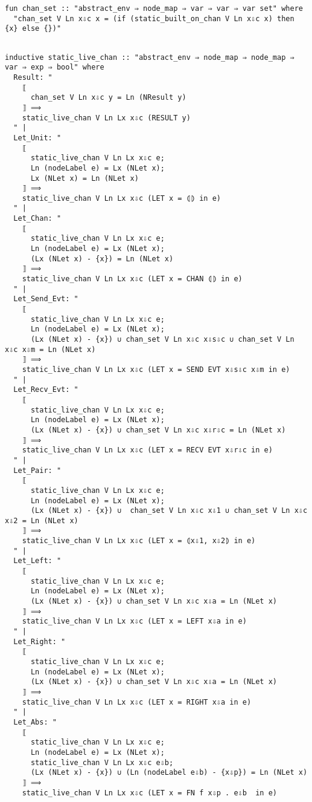 \documentclass{article}
\begin{document}
\begin{lstlisting}[style=codestyle1, escapechar=\%]
  fun chan_set :: "abstract_env ⇒ node_map ⇒ var ⇒ var ⇒ var set" where
  "chan_set V Ln x⇩c x = (if (static_built_on_chan V Ln x⇩c x) then {x} else {})"
  \end{lstlisting}


\begin{lstlisting}[style=codestyle1, escapechar=\%]

inductive static_live_chan :: "abstract_env ⇒ node_map ⇒ node_map ⇒ var ⇒ exp ⇒ bool" where
  Result: "
    ⟦
      chan_set V Ln x⇩c y = Ln (NResult y)
    ⟧ ⟹
    static_live_chan V Ln Lx x⇩c (RESULT y)
  " |
  Let_Unit: "
    ⟦
      static_live_chan V Ln Lx x⇩c e;
      Ln (nodeLabel e) = Lx (NLet x);
      Lx (NLet x) = Ln (NLet x)
    ⟧ ⟹
    static_live_chan V Ln Lx x⇩c (LET x = ⦇⦈ in e)
  " |
  Let_Chan: "
    ⟦
      static_live_chan V Ln Lx x⇩c e;
      Ln (nodeLabel e) = Lx (NLet x);
      (Lx (NLet x) - {x}) = Ln (NLet x)
    ⟧ ⟹
    static_live_chan V Ln Lx x⇩c (LET x = CHAN ⦇⦈ in e)
  " |
  Let_Send_Evt: "
    ⟦
      static_live_chan V Ln Lx x⇩c e;
      Ln (nodeLabel e) = Lx (NLet x);
      (Lx (NLet x) - {x}) ∪ chan_set V Ln x⇩c x⇩s⇩c ∪ chan_set V Ln x⇩c x⇩m = Ln (NLet x)
    ⟧ ⟹
    static_live_chan V Ln Lx x⇩c (LET x = SEND EVT x⇩s⇩c x⇩m in e)
  " |
  Let_Recv_Evt: "
    ⟦
      static_live_chan V Ln Lx x⇩c e;
      Ln (nodeLabel e) = Lx (NLet x);
      (Lx (NLet x) - {x}) ∪ chan_set V Ln x⇩c x⇩r⇩c = Ln (NLet x)
    ⟧ ⟹
    static_live_chan V Ln Lx x⇩c (LET x = RECV EVT x⇩r⇩c in e)
  " |
  Let_Pair: "
    ⟦
      static_live_chan V Ln Lx x⇩c e;
      Ln (nodeLabel e) = Lx (NLet x);
      (Lx (NLet x) - {x}) ∪  chan_set V Ln x⇩c x⇩1 ∪ chan_set V Ln x⇩c x⇩2 = Ln (NLet x)
    ⟧ ⟹
    static_live_chan V Ln Lx x⇩c (LET x = ⦇x⇩1, x⇩2⦈ in e)
  " |
  Let_Left: "
    ⟦
      static_live_chan V Ln Lx x⇩c e;
      Ln (nodeLabel e) = Lx (NLet x);
      (Lx (NLet x) - {x}) ∪ chan_set V Ln x⇩c x⇩a = Ln (NLet x)
    ⟧ ⟹
    static_live_chan V Ln Lx x⇩c (LET x = LEFT x⇩a in e)
  " |
  Let_Right: "
    ⟦
      static_live_chan V Ln Lx x⇩c e;
      Ln (nodeLabel e) = Lx (NLet x);
      (Lx (NLet x) - {x}) ∪ chan_set V Ln x⇩c x⇩a = Ln (NLet x)
    ⟧ ⟹
    static_live_chan V Ln Lx x⇩c (LET x = RIGHT x⇩a in e)
  " |
  Let_Abs: "
    ⟦
      static_live_chan V Ln Lx x⇩c e;
      Ln (nodeLabel e) = Lx (NLet x);
      static_live_chan V Ln Lx x⇩c e⇩b;
      (Lx (NLet x) - {x}) ∪ (Ln (nodeLabel e⇩b) - {x⇩p}) = Ln (NLet x)
    ⟧ ⟹
    static_live_chan V Ln Lx x⇩c (LET x = FN f x⇩p . e⇩b  in e)

\end{lstlisting}
\end{document}
